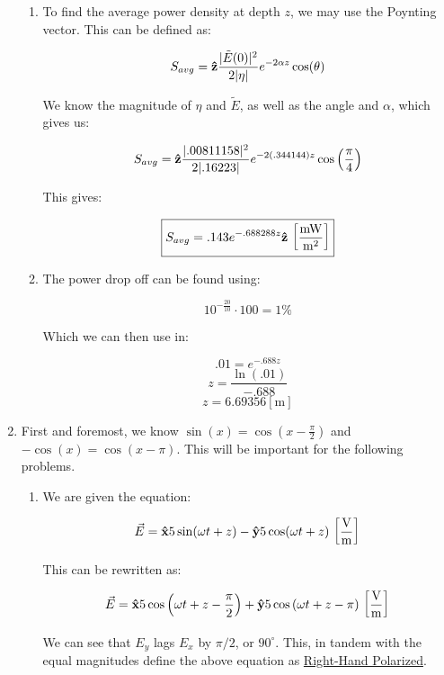 \begin{enumerate}
\begin{enumerate}
      \item 

        To find the average power density at depth $z$, we may use the Poynting vector. This can be defined as:

        $$S_{avg}=\bold{\hat{z}}\frac{|\tilde{E}(0)|^2}{2|\eta|}e^{-2\alpha z}\cos(\theta)$$

        We know the magnitude of $\eta$ and $\tilde{E}$, as well as the angle and $\alpha$, which gives us:

        $$S_{avg}=\bold{\hat{z}}\frac{|.00811158|^2}{2|.16223|}e^{-2(.344144) z}\cos\left( \frac{\pi}{4} \right)$$

        This gives:

        $$\boxed{S_{avg}=.143e^{-.688288z}\bold{\hat{z}}\,\left[ \frac{\si{\milli\watt}}{\si{\meter\squared}} \right]}$$

      \item 

        The power drop off can be found using:

        $$10^{-\frac{20}{10}}\cdot100=1\%$$

        Which we can then use in:

        $$.01=e^{-.688z}$$
        $$z=\frac{\ln(.01)}{-.688}$$
        $$\boxed{z=6.69356[\si{\meter}]}$$

    \end{enumerate}

  \item

        First and foremost, we know $\sin(x)=\cos\left( x-\frac{\pi}{2} \right)$ and $-\cos(x)=\cos(x-\pi)$. This will be important for the following problems.

    \begin{enumerate}

      \item 

        We are given the equation:

        $$\vec{E}=\bold{\hat{x}}5\sin(\omega t + z)-\bold{\hat{y}}5\cos(\omega t + z)\,\left[ \frac{\si{\volt}}{\si{\meter}} \right]$$

        This can be rewritten as:

        $$\vec{E}=\bold{\hat{x}}5\cos\left(\omega t + z - \frac{\pi}{2}\right)+\bold{\hat{y}}5\cos\left(\omega t + z-\pi\right)\,\left[ \frac{\si{\volt}}{\si{\meter}} \right]$$

        We can see that $E_y$ lags $E_x$ by $\pi/2$, or $90^{\circ}$. This, in tandem with the equal magnitudes define the above equation as \underline{Right-Hand Polarized}.


\end{enumerate}
\end{enumerate}
